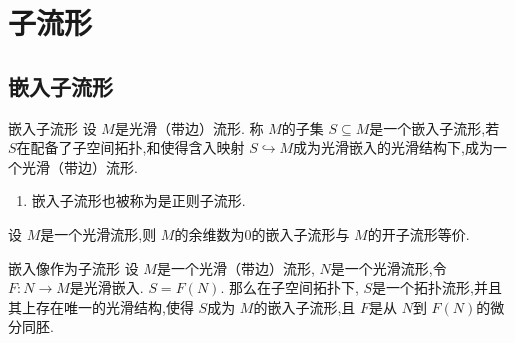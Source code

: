 \documentclass[../../几何与拓扑.tex]{subfiles}
\begin{document}
\ifSubfilesClassLoaded{
    \frontmatter

    \tableofcontents
    
    \mainmatter
}{}

\chapter{子流形}

\section{嵌入子流形}

\begin{definition}{嵌入子流形}
    设 \(  M  \)是光滑（带边）流形.
    称 \(  M  \)的子集 \(  S\subseteq M  \)是一个嵌入子流形,若 \(  S  \)在配备了子空间拓扑,和使得含入映射 \(  S\hookrightarrow M  \)成为光滑嵌入的光滑结构下,成为一个光滑（带边）流形.     
\end{definition}

\begin{remark}
    \begin{enumerate}
        \item 嵌入子流形也被称为是正则子流形.
    \end{enumerate}
    
\end{remark}

\begin{proposition}
    设 \(  M  \)是一个光滑流形,则 \(  M  \)的余维数为0的嵌入子流形与 \(  M  \)的开子流形等价.   
\end{proposition}

\begin{proposition}{嵌入像作为子流形}
    设 \(  M  \)是一个光滑（带边）流形, \(  N  \)是一个光滑流形,令 \(  F: N\to M  \)是光滑嵌入.
    \(  S =  F\left( N \right)   \).
    那么在子空间拓扑下, \(  S  \)是一个拓扑流形,并且其上存在唯一的光滑结构,使得 \(  S  \)成为 \(  M  \)的嵌入子流形,且 \(  F  \)是从 \(  N  \)到 \(  F\left( N \right)   \)的微分同胚.           
\end{proposition}
\end{document}
